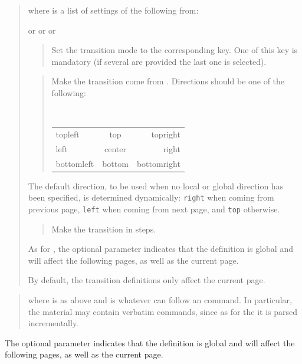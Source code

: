 \documentclass[12pt]{article}
\begin{document}
\docdef \advitransition \doctt {[global]}
\begin{quote}
where  is a list of settings of the following from:

 or  or  or 
\begin{quote}
Set the transition mode to the corresponding key.
One of this key is mandatory (if several are provided the last one is
selected).
\end{quote}

\begin{quote}
Make the transition come from .  Directions should be
one of the following:
\begin{center}
\tt
\begin{tabular}{l@{\qquad}c@{\qquad}r}
topleft&   top& topright\\
left&  center&  right \\
bottomleft& bottom & bottomright\\
\end{tabular}
\end{center}
\end{quote}
The default direction, to be used when no local or global direction has been
specified, is determined dynamically: \verb"right" when coming from
previous page, \verb"left" when coming from next page, and \verb"top"
otherwise.

\begin{quote}
Make the transition in  steps. 
\end{quote}
As for \docdef \advibg, the optional parameter  indicates that
the definition is global and will affect the following pages, 
as well as the current page. 

By default, the transition definitions only affect the current page. 
\end{quote}

\medskip\noindent
\docdef \advitransbox {}
\begin{quote}
where  is as above and  is
whatever can follow an \docdef \hbox{} command. In particular, the material
may contain verbatim commands, since as for the \docdef\hbox{} it is 
parsed incrementally.
\end{quote}

The optional parameter  indicates that
the definition is global and will affect the following pages, 
as well as the current page.
\end{document}
